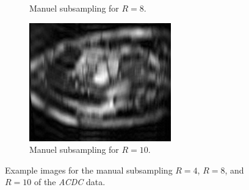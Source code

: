 \begin{figure}[h]
\begin{subfigure}{0.3\textwidth}
    		\caption{Manuel subsampling for $R=8$.}
    		\label{fig:ManuelSubsampling_ACDC_R=8}
	\end{subfigure}
	\hfill 
	\begin{subfigure}{0.3\textwidth}
    		\includegraphics[width=\textwidth]{./Images/ManuelSubsampling_ACDC_R=10.png}
    		\caption{Manuel subsampling for $R=10$.}
    		\label{fig:ManuelSubsampling_ACDC_R=10}
	\end{subfigure}
	\caption{Example images for the manual subsampling $R=4$, $R=8$, and $R=10$ of the \emph{ACDC} data.}
	\label{fig:ManuelSubsampling_ACDC}
\end{figure}


